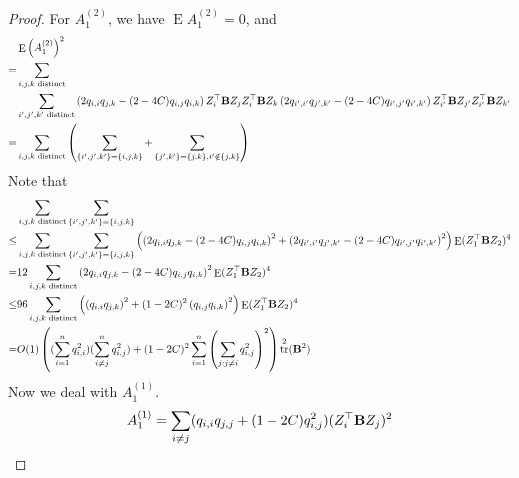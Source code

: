 \documentclass[11pt]{article}
\DeclareMathOperator{\mytr}{tr}
\DeclareMathOperator{\myE}{E}
\theoremstyle{plain}
\theoremstyle{definition}
\theoremstyle{remark}
\begin{document}
\begin{proof}
For $A_1^{(2)}$,
we have $\myE A_1^{(2)}=0$, and
\begin{equation*}
    \begin{split}
        &\myE \left( A_1^{(2)}\right)^2
        \\
        =
        &
    \sum_{i,j,k \text{ distinct}}
    \\
    &
    \sum_{i',j',k' \text{ distinct}}
    \left(2 q_{i,i}q_{j,k}-(2-4C) q_{i,j} q_{i,k}\right)
    Z_{i}^\top \BB Z_j Z_i^\top \BB Z_k
    \left(2 q_{i',i'}q_{j',k'}-(2-4C) q_{i',j'} q_{i',k'}\right)
    Z_{i'}^\top \BB Z_{j'} Z_{i'}^\top \BB Z_{k'}
    \\
        =
        &
    \sum_{i,j,k \text{ distinct}}
    \left(
        \sum_{\{i',j',k'\}=\{i,j,k\}}
        +
        \sum_{\{j',k'\}=\{j,k\},i'\notin \{j,k\}}
\right)
    \end{split}
\end{equation*}
Note that
\begin{equation*}
    \begin{split}
    &
    \sum_{i,j,k \text{ distinct}}
    \sum_{\{i',j',k'\}=\{i,j,k\}}
    \\
    \leq&
    \sum_{i,j,k \text{ distinct}}
    \sum_{\{i',j',k'\}=\{i,j,k\}}
    \left(
    \left(2 q_{i,i}q_{j,k}-(2-4C) q_{i,j} q_{i,k}\right)^2
    +
    \left(2 q_{i',i'}q_{j',k'}-(2-4C) q_{i',j'} q_{i',k'}\right)^2
\right)
    \myE (Z_1^\top \BB Z_2)^4
    \\
    =&
    12
    \sum_{i,j,k \text{ distinct}}
    \left(2 q_{i,i}q_{j,k}-(2-4C) q_{i,j} q_{i,k}\right)^2
    \myE (Z_1^\top \BB Z_2)^4
    \\
    \leq&
    96
    \sum_{i,j,k \text{ distinct}}
\left(
    \left( q_{i,i}q_{j,k}\right)^2+(1-2C)^2\left( q_{i,j} q_{i,k}\right)^2
\right)
    \myE (Z_1^\top \BB Z_2)^4
    \\
    =&
    O(1)
    \left(
        (\sum_{i=1}^n q_{i,i}^2)
        (\sum_{i\neq j}^n q_{i,j}^2)
        +
        (1-2C)^2
        \sum_{i=1}^n \left(\sum_{j:j\neq i} q_{i,j}^2\right)^2
\right)
    \mytr^2(\BB^2)
    \end{split}
\end{equation*}
Now we deal with $A_1^{(1)}$.
\begin{equation*}
    A_1^{(1)}=\sum_{i\neq j}( q_{i,i} q_{j,j} + (1-2C) q_{i,j}^2 ) (Z_i^\top \mathbf{B} Z_j)^2
\end{equation*}


\end{proof}
\end{document}
